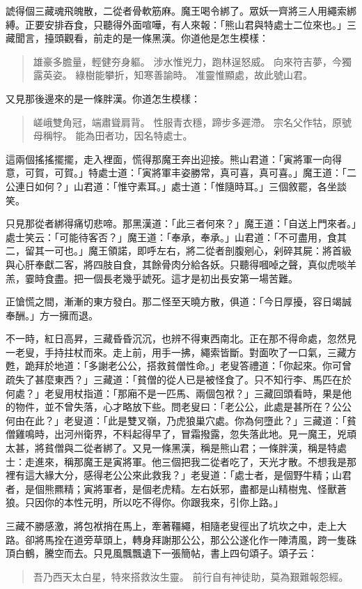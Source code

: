 諕得個三藏魂飛魄散，二從者骨軟筋麻。魔王喝令綁了。眾妖一齊將三人用繩索綁縛。正要安排吞食，只聽得外面喧嘩，有人來報：「熊山君與特處士二位來也。」三藏聞言，擡頭觀看，前走的是一條黑漢。你道他是怎生模樣：
\begin{quote}
雄豪多膽量，輕健夯身軀。
涉水惟兇力，跑林逞怒威。
向來符吉夢，今獨露英姿。
綠樹能攀折，知寒善諭時。
准靈惟顯處，故此號山君。
\end{quote}

又見那後邊來的是一條胖漢。你道怎生模樣：
\begin{quote}
嵯峨雙角冠，端肅聳肩背。
性服青衣穩，蹄步多遲滯。
宗名父作牯，原號母稱牸。
能為田者功，因名特處士。
\end{quote}

這兩個搖搖擺擺，走入裡面，慌得那魔王奔出迎接。熊山君道：「寅將軍一向得意，可賀，可賀。」特處士道：「寅將軍丰姿勝常，真可喜，真可喜。」魔王道：「二公連日如何？」山君道：「惟守素耳。」處士道：「惟隨時耳。」三個敘罷，各坐談笑。

只見那從者綁得痛切悲啼。那黑漢道：「此三者何來？」魔王道：「自送上門來者。」處士笑云：「可能待客否？」魔王道：「奉承，奉承。」山君道：「不可盡用，食其二，留其一可也。」魔王領諾，即呼左右，將二從者剖腹剜心，剁碎其屍：將首級與心肝奉獻二客，將四肢自食，其餘骨肉分給各妖。只聽得嘓啅之聲，真似虎啖羊羔，霎時食盡。把一個長老幾乎諕死。這才是初出長安第一場苦難。

正愴慌之間，漸漸的東方發白。那二怪至天曉方散，俱道：「今日厚擾，容日竭誠奉酬。」方一擁而退。

不一時，紅日高昇，三藏昏昏沉沉，也辨不得東西南北。正在那不得命處，忽然見一老叟，手持拄杖而來。走上前，用手一拂，繩索皆斷。對面吹了一口氣，三藏方甦，跪拜於地道：「多謝老公公，搭救貧僧性命。」老叟答禮道：「你起來。你可曾疏失了甚麼東西？」三藏道：「貧僧的從人已是被怪食了。只不知行李、馬匹在於何處？」老叟用杖指道：「那廂不是一匹馬、兩個包袱？」三藏回頭看時，果是他的物件，並不曾失落，心才略放下些。問老叟曰：「老公公，此處是甚所在？公公何由在此？」老叟道：「此是雙叉嶺，乃虎狼巢穴處。你為何墮此？」三藏道：「貧僧雞鳴時，出河州衛界，不料起得早了，冒霜撥露，忽失落此地。見一魔王，兇頑太甚，將貧僧與二從者綁了。又見一條黑漢，稱是熊山君；一條胖漢，稱是特處士：走進來，稱那魔王是寅將軍。他三個把我二從者吃了，天光才散。不想我是那裡有這大緣大分，感得老公公來此救我？」老叟道：「處士者，是個野牛精；山君者，是個熊羆精；寅將軍者，是個老虎精。左右妖邪，盡都是山精樹鬼、怪獸蒼狼。只因你的本性元明，所以吃不得你。你跟我來，引你上路。」

三藏不勝感激，將包袱捎在馬上，牽著韁繩，相隨老叟徑出了坑坎之中，走上大路。卻將馬拴在道旁草頭上，轉身拜謝那公公，那公公遂化作一陣清風，跨一隻硃頂白鶴，騰空而去。只見風飄飄遺下一張簡帖，書上四句頌子。頌子云：
\begin{quote}
吾乃西天太白星，特來搭救汝生靈。
前行自有神徒助，莫為艱難報怨經。
\end{quote}

